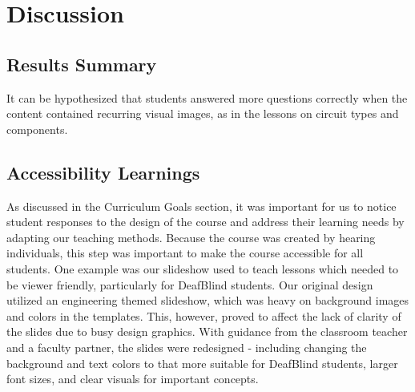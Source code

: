 \documentclass[11.5pt]{sig-alternate}
\begin{document}
\begin{large}
\begin{figure}[h!]
\end{figure}

\section*{ Discussion}
\subsection*{Results Summary}
It can be hypothesized that students answered more questions correctly when the content contained recurring visual images, as in the lessons on circuit types and components.
\subsection*{Accessibility Learnings}

As discussed in the Curriculum Goals section, it was important for us to notice student responses to the design of the course and address their learning needs by adapting our teaching methods. Because the course was created by hearing individuals, this step was important to make the course accessible for all students. One example was our slideshow used to teach lessons which needed to be viewer friendly, particularly for DeafBlind students. Our original design utilized an engineering themed slideshow, which was heavy on background images and colors in the templates. This, however, proved to affect the lack of clarity of the slides due to busy design graphics. With guidance from the classroom teacher and a faculty partner, the slides were redesigned - including changing the background and text colors to that more suitable for DeafBlind students, larger font sizes, and clear visuals for important concepts.


\end{large}
\end{document}
